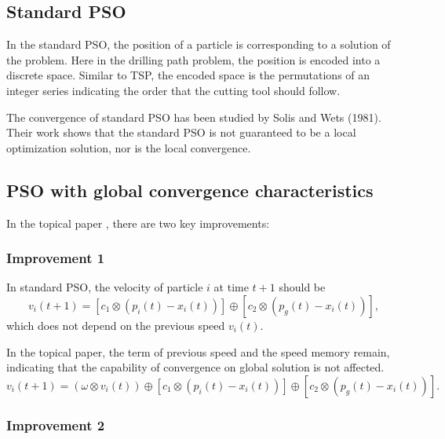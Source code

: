 \documentclass{IEEEtran}
\begin{document}
{    \subsection{Standard PSO}
    {
        In the standard PSO, the position of a particle is corresponding to a solution of the problem.
        Here in the drilling path problem, the position is encoded into a discrete space.
        Similar to TSP, the encoded space is the permutations of an integer series indicating the order that the cutting tool should follow.

        The convergence of standard PSO has been studied by Solis and Wets (1981). 
        Their work shows that the standard PSO is not guaranteed to be a local optimization solution, nor is the local convergence.
    }

    \subsection{PSO with global convergence characteristics}
    {
        In the topical paper \cite{zhu2008drilling}, there are two key improvements:

        \subsubsection{Improvement 1}
        {
            In standard PSO, the velocity of particle $i$ at time $t+1$ should be
            $$v_i(t+1) = [c_1 \otimes (p_i(t) - x_i(t))] \oplus [c_2 \otimes (p_g(t) - x_i(t))],$$
            which does not depend on the previous speed $v_i(t)$.
        
            In the topical paper, the term of previous speed and the speed memory remain, indicating that the capability of convergence on global solution is not affected.
            $$v_i(t+1) = (\omega \otimes v_i(t)) \oplus [c_1 \otimes (p_i(t) - x_i(t))] \oplus [c_2 \otimes (p_g(t) - x_i(t))].$$
            
        }

        \subsubsection{Improvement 2}
        {

        }
    }

}



\end{document}
